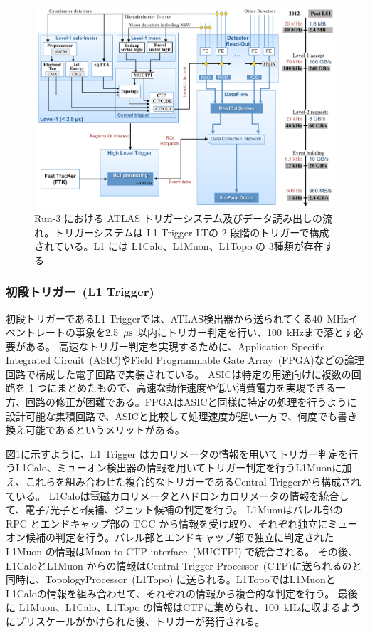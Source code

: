 \begin{figure}[tb]
  \centering
  \includegraphics[clip, width=14cm]{fig/3/trigger-nagare2.pdf}
  \caption{Run-3 における ATLAS トリガーシステム及びデータ読み出しの流れ\cite{article:Run3trigger}。トリガーシステムは L1 Trigger LTの 2 段階のトリガーで構成されている。L1 には L1Calo、L1Muon、L1Topo の 3種類が存在する}
  \label{fig:トリガーの全体像}
\end{figure}

\subsubsection{初段トリガー~(L1 Trigger)}\label{L1Topo}
初段トリガーであるL1 Triggerでは、ATLAS検出器から送られてくる40~MHzイベントレートの事象を2.5~$\rm{\mu s}$ 以内にトリガー判定を行い、100~kHzまで落とす必要がある。
高速なトリガー判定を実現するために、Application Specific Integrated Circuit~(ASIC)やField Programmable Gate Array~(FPGA)などの論理回路で構成した電子回路で実装されている。
ASICは特定の用途向けに複数の回路を 1 つにまとめたもので、高速な動作速度や低い消費電力を実現できる一方、回路の修正が困難である。FPGAはASICと同様に特定の処理を行うように設計可能な集積回路で、ASICと比較して処理速度が遅い一方で、何度でも書き換え可能であるというメリットがある。

図\ref{fig:トリガーの全体像}に示すように、L1 Trigger はカロリメータの情報を用いてトリガー判定を行うL1Calo、ミューオン検出器の情報を用いてトリガー判定を行うL1Muonに加え、これらを組み合わせた複合的なトリガーであるCentral Triggerから構成されている。
L1Caloは電磁カロリメータとハドロンカロリメータの情報を統合して、電子/光子と$\tau$候補、ジェット候補の判定を行う。
L1Muonはバレル部の RPC とエンドキャップ部の TGC から情報を受け取り、それぞれ独立にミューオン候補の判定を行う。バレル部とエンドキャップ部で独立に判定された L1Muon の情報はMuon-to-CTP interface~(MUCTPI) で統合される。
その後、L1CaloとL1Muon からの情報はCentral Trigger Processor~(CTP)に送られるのと同時に、TopologyProcessor~(L1Topo) に送られる。L1TopoではL1MuonとL1Caloの情報を組み合わせて、それぞれの情報から複合的な判定を行う。
最後に L1Muon、L1Calo、L1Topo の情報はCTPに集められ、100~kHzに収まるようにプリスケールがかけられた後、トリガーが発行される。

